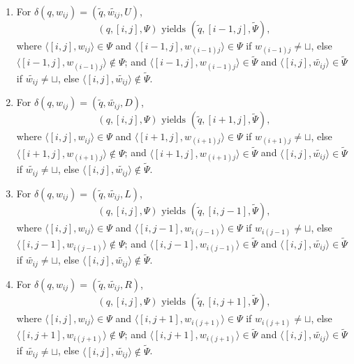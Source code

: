 \documentclass[12pt]{article}
\begin{document}
\begin{enumerate}
	\item For $\delta(q, w_{ij}) = (\tilde{q}, \tilde{w_{ij}}, U)$, \[\left(q, [i, j], \Psi \right) \text{ yields } \left(\tilde{q}, [i-1, j], \tilde{\Psi} \right),\]
where $\langle [i, j], w_{ij} \rangle \in \Psi$ and $\langle [i-1, j], w_{(i-1)j} \rangle \in \Psi$ if $w_{(i-1)j} \neq \sqcup$, else $\langle [i-1, j], w_{(i-1)j} \rangle \not \in \Psi$; and $\langle [i-1, j], w_{(i-1)j} \rangle \in \tilde{\Psi}$ and $\langle [i, j], \tilde{w_{ij}} \rangle \in \tilde{\Psi}$ if $\tilde{w_{ij}} \neq \sqcup$, else $\langle [i, j], \tilde{w_{ij}} \rangle \not \in \tilde{\Psi}$.
	\item For $\delta(q, w_{ij}) = (\tilde{q}, \tilde{w_{ij}}, D)$, \[\left(q, [i, j], \Psi \right) \text{ yields } \left(\tilde{q}, [i+1, j], \tilde{\Psi} \right),\]
where $\langle [i, j], w_{ij} \rangle \in \Psi$ and $\langle [i+1, j], w_{(i+1)j} \rangle \in \Psi$ if $w_{(i+1)j} \neq \sqcup$, else $\langle [i+1, j], w_{(i+1)j} \rangle \not \in \Psi$; and $\langle [i+1, j], w_{(i+1)j} \rangle \in \tilde{\Psi}$ and $\langle [i, j], \tilde{w_{ij}} \rangle \in \tilde{\Psi}$ if $\tilde{w_{ij}} \neq \sqcup$, else $\langle [i, j], \tilde{w_{ij}} \rangle \not \in \tilde{\Psi}$.
	\item For $\delta(q, w_{ij}) = (\tilde{q}, \tilde{w_{ij}}, L)$, \[\left(q, [i, j], \Psi \right) \text{ yields } \left(\tilde{q}, [i, j-1], \tilde{\Psi} \right),\]
where $\langle [i, j], w_{ij} \rangle \in \Psi$ and $\langle [i, j-1], w_{i(j-1)} \rangle \in \Psi$ if $w_{i(j-1)} \neq \sqcup$, else $\langle [i, j-1], w_{i(j-1)} \rangle \not \in \Psi$; and $\langle [i, j-1], w_{i(j-1)} \rangle \in \tilde{\Psi}$ and $\langle [i, j], \tilde{w_{ij}} \rangle \in \tilde{\Psi}$ if $\tilde{w_{ij}} \neq \sqcup$, else $\langle [i, j], \tilde{w_{ij}} \rangle \not \in \tilde{\Psi}$.
	\item For $\delta(q, w_{ij}) = (\tilde{q}, \tilde{w_{ij}}, R)$, \[\left(q, [i, j], \Psi \right) \text{ yields } \left(\tilde{q}, [i, j+1], \tilde{\Psi} \right),\]
where $\langle [i, j], w_{ij} \rangle \in \Psi$ and $\langle [i, j+1], w_{i(j+1)} \rangle \in \Psi$ if $w_{i(j+1)} \neq \sqcup$, else $\langle [i, j+1], w_{i(j+1)} \rangle \not \in \Psi$; and $\langle [i, j+1], w_{i(j+1)} \rangle \in \tilde{\Psi}$ and $\langle [i, j], \tilde{w_{ij}} \rangle \in \tilde{\Psi}$ if $\tilde{w_{ij}} \neq \sqcup$, else $\langle [i, j], \tilde{w_{ij}} \rangle \not \in \tilde{\Psi}$.
\end{enumerate}
\end{document}
